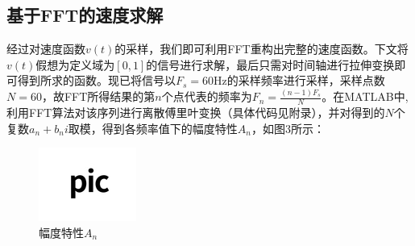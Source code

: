 \documentclass[bwprint]{cumcmthesis}
\begin{document}
        \subsection{基于FFT的速度求解}
        经过对速度函数$v(t)$的采样，我们即可利用FFT重构出完整的速度函数。下文将$v(t)$假想为定义域为$[0,1]$的信号进行求解，最后只需对时间轴进行拉伸变换即可得到所求的函数。现已将信号以$F_s=60\mathrm{Hz}$的采样频率进行采样，采样点数$N=60$，故FFT所得结果的第$n$个点代表的频率为$F_n=\frac{(n-1)F_s}{N}$。在MATLAB中,利用FFT算法对该序列进行离散傅里叶变换（具体代码见附录），并对得到的$N$个复数$a_n+b_ni$取模，得到各频率值下的幅度特性$A_n$，如图3所示：
        \begin{figure}[htbp]
            \centering
            \includegraphics[width=0.5\linewidth]{test.jpg}
            \caption{幅度特性$A_n$}
        \end{figure}
\end{document}
